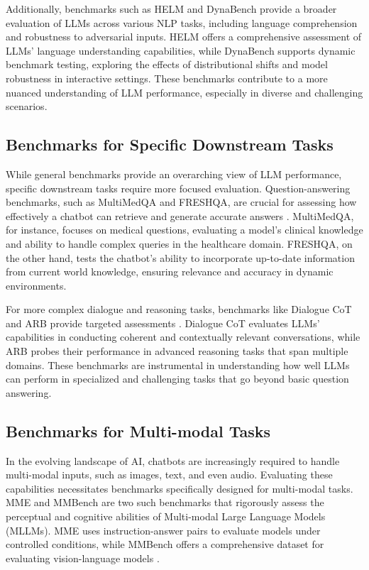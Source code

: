 Additionally, benchmarks such as HELM \cite{liang2022holistic} and DynaBench \cite{kiela2021dynabench} provide a broader evaluation of LLMs across various NLP tasks, including language comprehension and robustness to adversarial inputs. HELM offers a comprehensive assessment of LLMs' language understanding capabilities, while DynaBench supports dynamic benchmark testing, exploring the effects of distributional shifts and model robustness in interactive settings. These benchmarks contribute to a more nuanced understanding of LLM performance, especially in diverse and challenging scenarios.

\subsection{Benchmarks for Specific Downstream Tasks}

While general benchmarks provide an overarching view of LLM performance, specific downstream tasks require more focused evaluation. Question-answering benchmarks, such as MultiMedQA and FRESHQA, are crucial for assessing how effectively a chatbot can retrieve and generate accurate answers \cite{singhal2022large, vu2023freshllms}. MultiMedQA, for instance, focuses on medical questions, evaluating a model's clinical knowledge and ability to handle complex queries in the healthcare domain. FRESHQA, on the other hand, tests the chatbot's ability to incorporate up-to-date information from current world knowledge, ensuring relevance and accuracy in dynamic environments.

For more complex dialogue and reasoning tasks, benchmarks like Dialogue CoT and ARB provide targeted assessments \cite{wang2023cue, sawada2023arb}. Dialogue CoT evaluates LLMs' capabilities in conducting coherent and contextually relevant conversations, while ARB probes their performance in advanced reasoning tasks that span multiple domains. These benchmarks are instrumental in understanding how well LLMs can perform in specialized and challenging tasks that go beyond basic question answering.

\subsection{Benchmarks for Multi-modal Tasks}

In the evolving landscape of AI, chatbots are increasingly required to handle multi-modal inputs, such as images, text, and even audio. Evaluating these capabilities necessitates benchmarks specifically designed for multi-modal tasks. MME and MMBench are two such benchmarks that rigorously assess the perceptual and cognitive abilities of Multi-modal Large Language Models (MLLMs). MME uses instruction-answer pairs to evaluate models under controlled conditions, while MMBench offers a comprehensive dataset for evaluating vision-language models \cite{yin2023survey, liu2023mmbench}.


